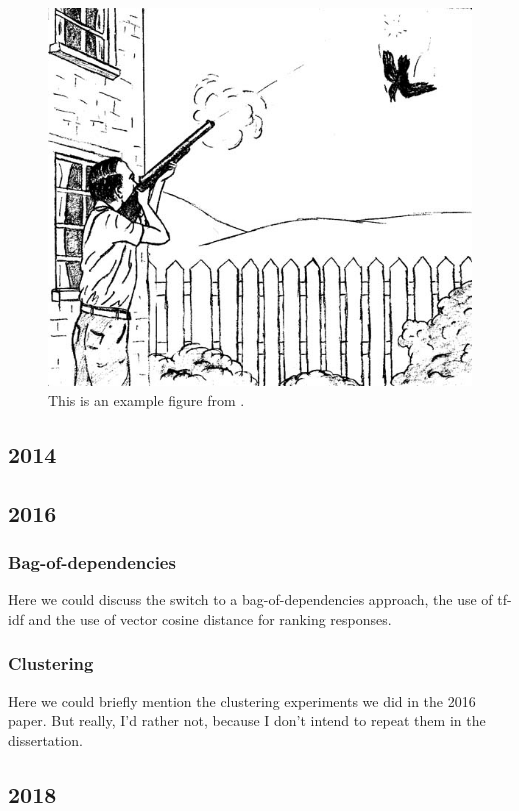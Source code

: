 \begin{figure}
\includegraphics[width=.7\textwidth]{figures/exampleprompt2.jpg}
\caption{This is an example figure from \citet{king:dickinson:13}.}
\label{figure:KandD2013}
\end{figure}

\subsection{2014}
\citet{king:dickinson:14}

\subsection{2016}
\citep{king:dickinson:16}

\subsubsection{Bag-of-dependencies}
Here we could discuss the switch to a bag-of-dependencies approach, the use of tf-idf and the use of vector cosine distance for ranking responses.

\subsubsection{Clustering}
Here we could briefly mention the clustering experiments we did in the 2016 paper. But really, I'd rather not, because I don't intend to repeat them in the dissertation.

\subsection{2018}
\cite{king:dickinson:18}

